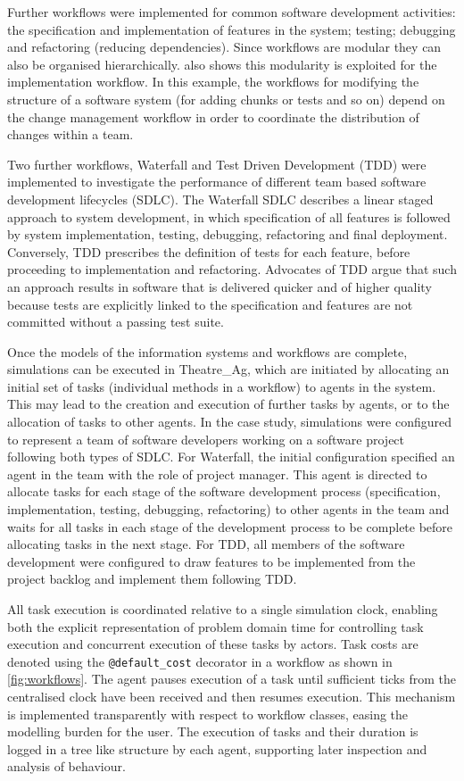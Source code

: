 \documentclass{llncs}
\begin{document}
Further workflows were implemented for common software development activities: the specification and implementation of
features in the system; testing; debugging and refactoring (reducing dependencies).  Since workflows are modular they
can also be organised hierarchically.   also shows this modularity is exploited for the
implementation workflow. In this example, the workflows for modifying the structure of a software system (for adding
chunks or tests and so on) depend on the change management workflow in order to coordinate the distribution of changes
within a team.

Two further workflows, Waterfall and Test Driven Development (TDD) were implemented to investigate the performance of
different team based software development lifecycles (SDLC).  The Waterfall SDLC \citep{benington83production} describes
a linear staged approach to system development, in which specification of all features is followed by system
implementation, testing, debugging, refactoring and final deployment.  Conversely, TDD \citep{beck02test} prescribes the
definition of tests for each feature, before proceeding to implementation and refactoring.  Advocates of TDD argue that
such an approach results in software that is delivered quicker and of higher quality because tests are explicitly linked
to the specification and features are not committed without a passing test suite.

Once the models of the information systems and workflows are complete, simulations can be executed in Theatre\_Ag, which
are initiated by allocating an initial set of tasks (individual methods in a workflow) to agents in the system. This may
lead to the creation and execution of further tasks by agents, or to the allocation of tasks to other agents.  In the
case study, simulations were configured to represent a team of software developers working on a software project
following both types of SDLC.  For Waterfall, the initial configuration specified an agent in the team with the role of
project manager.  This agent is directed to allocate tasks for each stage of the software development process
(specification, implementation, testing, debugging, refactoring) to other agents in the team and waits for all tasks in
each stage of the development process to be complete before allocating tasks in the next stage.  For TDD, all members of
the software development were configured to draw features to be implemented from the project backlog and implement them
following TDD.

All task execution is coordinated relative to a single simulation clock, enabling both the explicit representation of
problem domain time for controlling task execution and concurrent execution of these tasks by actors.  Task costs are
denoted using the \lstinline!@default_cost! decorator in a workflow as shown in \cref{fig:workflows}.  The agent
pauses execution of a task until sufficient ticks from the centralised clock have been received and then resumes execution.
This mechanism is implemented transparently with respect to workflow classes, easing the modelling burden for the user.
The execution of tasks and their duration is logged in a tree like structure by each agent, supporting later inspection
and analysis of behaviour.
\end{document}
